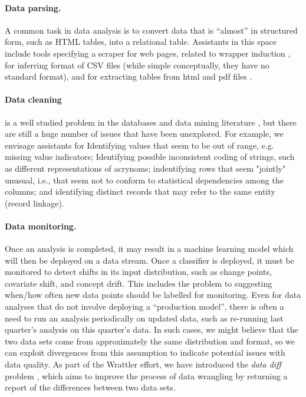 \documentclass[sigplan,preprint,10pt]{acmart}\settopmatter{printfolios=true,printccs=false,printacmref=false}
\theoremstyle{plain}
\theoremstyle{definition}
\begin{document}
{{\paragraph{Data parsing.}
A common task in data analysis is to convert
data that is ``almost'' in structured form,
such as HTML tables, into a relational table.
Assistants in this space include
tools specifying a scraper for web pages, related
to wrapper induction \cite{Kushmerick1997WrapperIF},
for inferring format of CSV files (while simple
conceptually, they have no standard format), and
for extracting tables from html and pdf files
\cite{pinto03table}.

\paragraph{Data cleaning} is a well studied
problem in the databases and data mining literature
\cite{abedjan2016detecting,ilyas2015},
but there are still a huge number of issues that have been unexplored.
For example, we envisage assistants for
Identifying values that seem to be out of range, e.g. missing value indicators;
Identifying possible inconsistent coding of strings,
such as different representations of acrynoms;
indentifying rows that seem "jointly" unusual, i.e., that seem not to conform to statistical dependencies among the columns; and
identifying distinct records that may refer to the same entity (record linkage).

\paragraph{Data monitoring.} Once an analysis
is completed, it may result in a machine learning
model which will then be deployed on a data stream.
Once a classifier is deployed, it must be monitored
to detect shifts in its input distribution,
such as change points, covariate shift, and
concept drift. This includes the problem
to suggesting when/how often new data points should be labelled for monitoring.
Even for data analyses that do not involve
deploying a ``production model'', there is
often a need to run an analysis periodically on updated data, such as re-running last quarter's
analysis on this quarter's data.
In such cases, we might believe that the two data
sets come from approximately the same distribution
and format, so we can exploit
divergences from this assumption to indicate
potential issues with data quality.
As part of the Wrattler effort, we have
introduced the \emph{data diff} problem \cite{datadiff},
which aims to improve the process of data wrangling by
returning a report of the differences between two data sets.

}}
\end{document}
